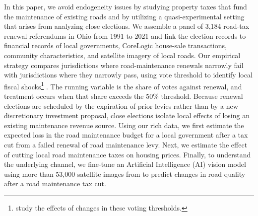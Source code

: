 

In this paper, we avoid endogeneity issues by studying property taxes that fund the maintenance of existing roads and by utilizing a quasi-experimental setting that arises from analyzing close elections.
We assemble a panel of 3,184 road-tax renewal referendums in Ohio from 1991 to 2021 and link the election records to financial records of local governments, CoreLogic house-sale transactions, community characteristics, and satellite imagery of local roads. Our empirical strategy compares jurisdictions where road-maintenance renewals narrowly fail with jurisdictions where they narrowly pass, using vote threshold to identify local fiscal shocks\footnote{\cite{grosz2025relaxing} study the effects of changes in these voting thresholds.} \citep{cellini2010value, biasi_what_2025}. The running variable is the share of votes against renewal, and treatment occurs when that share exceeds the 50\% threshold. Because renewal elections are scheduled by the expiration of prior levies rather than by a new discretionary investment proposal, close elections isolate local effects of losing an existing maintenance revenue source. Using our rich data, we first estimate the expected loss in the road maintenance budget for a local government after a tax cut from a failed renewal of road maintenance levy. Next, we estimate the effect of cutting local road maintenance taxes on housing prices. Finally, to understand the underlying channel, we fine-tune an Artificial Intelligence (AI) vision model using more than 53,000 satellite images from \cite{brewer2021} to predict changes in road quality after a road maintenance tax cut. 

